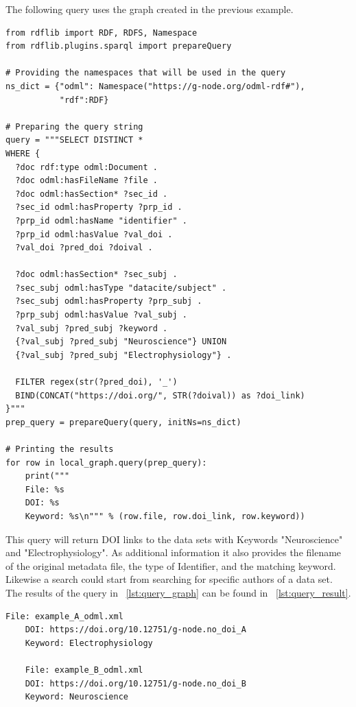 \documentclass{article}
\begin{document}
The following query uses the graph created in the previous example.

\begin{lstlisting}[label=lst:query_graph, caption=Example query, basicstyle=\small]
from rdflib import RDF, RDFS, Namespace
from rdflib.plugins.sparql import prepareQuery

# Providing the namespaces that will be used in the query
ns_dict = {"odml": Namespace("https://g-node.org/odml-rdf#"),
           "rdf":RDF}

# Preparing the query string
query = """SELECT DISTINCT *
WHERE {
  ?doc rdf:type odml:Document .
  ?doc odml:hasFileName ?file .
  ?doc odml:hasSection* ?sec_id .
  ?sec_id odml:hasProperty ?prp_id .
  ?prp_id odml:hasName "identifier" .
  ?prp_id odml:hasValue ?val_doi .
  ?val_doi ?pred_doi ?doival .

  ?doc odml:hasSection* ?sec_subj .
  ?sec_subj odml:hasType "datacite/subject" .
  ?sec_subj odml:hasProperty ?prp_subj .
  ?prp_subj odml:hasValue ?val_subj .
  ?val_subj ?pred_subj ?keyword .
  {?val_subj ?pred_subj "Neuroscience"} UNION
  {?val_subj ?pred_subj "Electrophysiology"} .

  FILTER regex(str(?pred_doi), '_')
  BIND(CONCAT("https://doi.org/", STR(?doival)) as ?doi_link)
}"""
prep_query = prepareQuery(query, initNs=ns_dict)

# Printing the results
for row in local_graph.query(prep_query):
    print("""
    File: %s
    DOI: %s
    Keyword: %s\n""" % (row.file, row.doi_link, row.keyword))
\end{lstlisting}

This query will return DOI links to the data sets with Keywords "Neuroscience" and "Electrophysiology". As additional information it also provides the filename of the original metadata file, the type of Identifier, and the matching keyword. Likewise a search could start from searching for specific authors of a data set. The results of the query in ~\ref{lst:query_graph} can be found in ~\ref{lst:query_result}.

\begin{lstlisting}[label=lst:query_result, caption=Query result, basicstyle=\small]
    File: example_A_odml.xml
    DOI: https://doi.org/10.12751/g-node.no_doi_A
    Keyword: Electrophysiology

    File: example_B_odml.xml
    DOI: https://doi.org/10.12751/g-node.no_doi_B
    Keyword: Neuroscience
\end{lstlisting}
\end{document}

